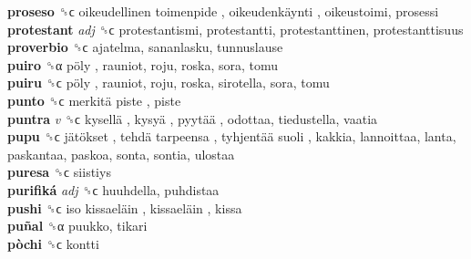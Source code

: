 \textbf{proseso} ␝ϲ   oikeudellinen toimenpide ,  oikeudenkäynti , oikeustoimi, prosessi  \\
\textbf{protestant} \emph{adj}  ␝ϲ  protestantismi, protestantti, protestanttinen, protestanttisuus  \\
\textbf{proverbio} ␝ϲ  ajatelma, sananlasku, tunnuslause  \\
\textbf{puiro} ␝α   pöly , rauniot, roju, roska, sora, tomu  \\
\textbf{puiru} ␝ϲ   pöly , rauniot, roju, roska, sirotella, sora, tomu  \\
\textbf{punto} ␝ϲ   merkitä piste , piste  \\
\textbf{puntra} \emph{v}  ␝ϲ   kysellä ,  kysyä ,  pyytää , odottaa, tiedustella, vaatia  \\
\textbf{pupu} ␝ϲ   jätökset ,  tehdä tarpeensa ,  tyhjentää suoli , kakkia, lannoittaa, lanta, paskantaa, paskoa, sonta, sontia, ulostaa  \\
\textbf{puresa} ␝ϲ  siistiys  \\
\textbf{purifiká} \emph{adj}  ␝ϲ  huuhdella, puhdistaa  \\
\textbf{pushi} ␝ϲ   iso kissaeläin ,  kissaeläin , kissa  \\
\textbf{puñal} ␝α  puukko, tikari  \\
\textbf{pòchi} ␝ϲ  kontti  \\
